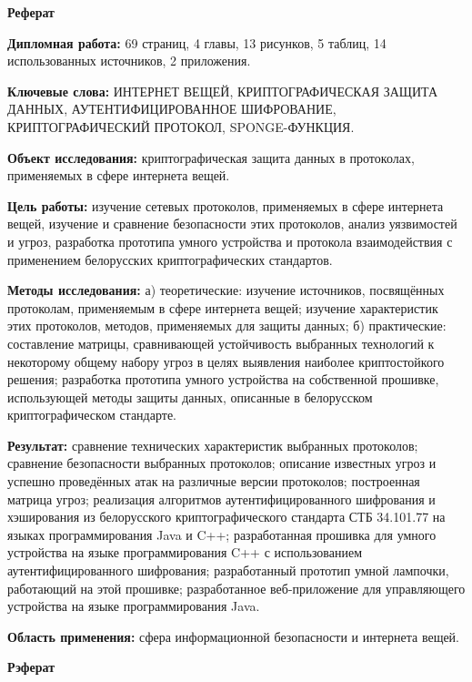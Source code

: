 \newpage
\begin{center}{\bf \Large Реферат}\end{center}
  
\textbf{Дипломная работа:} 69 страниц, 4 главы, 13 рисунков, 5 таблиц, 14 использованных источников,
2 приложения.

\textbf{Ключевые слова:} ИНТЕРНЕТ ВЕЩЕЙ, КРИПТОГРАФИЧЕСКАЯ ЗАЩИТА ДАННЫХ, 
АУТЕНТИФИЦИРОВАННОЕ ШИФРОВАНИЕ, КРИПТОГРАФИЧЕСКИЙ ПРОТОКОЛ,
SPONGE-ФУНКЦИЯ.

\textbf{Объект исследования:} криптографическая защита данных в протоколах, применяемых в сфере 
интернета вещей.

\textbf{Цель работы:} изучение сетевых протоколов, применяемых в сфере интернета вещей, изучение
и сравнение безопасности этих протоколов, анализ уязвимостей и угроз, разработка прототипа умного
устройства и протокола взаимодействия с применением белорусских криптографических стандартов.

\textbf{Методы исследования:} а) теоретические: изучение источников, посвящённых протоколам,
применяемым в сфере интернета вещей; изучение характеристик этих протоколов, методов, применяемых
для защиты данных; б) практические: составление матрицы, сравнивающей устойчивость выбранных 
технологий к некоторому общему набору угроз в целях выявления наиболее криптостойкого решения;
разработка прототипа умного устройства на собственной прошивке, использующей методы защиты
данных, описанные в белорусском криптографическом стандарте.

\textbf{Результат:} сравнение технических характеристик выбранных протоколов; сравнение безопасности
выбранных протоколов; описание известных угроз и успешно проведённых атак на различные версии
протоколов; построенная матрица угроз; реализация алгоритмов аутентифицированного шифрования 
и хэширования из белорусского криптографического стандарта СТБ 34.101.77 на языках программирования
Java и C++; разработанная прошивка для умного устройства на языке программирования C++
с использованием аутентифицированного шифрования; разработанный прототип умной лампочки, работающий
на этой прошивке; разработанное веб-приложение для управляющего устройства на языке
программирования Java.

\textbf{Область применения:} сфера информационной безопасности и интернета вещей.



\newpage
\begin{center}{\bf \Large Рэферат}\end{center}

